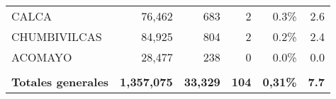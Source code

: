 \begin{tabular}{lrrrrr}
	\cellcolor[HTML]{9AFF99}CALCA         & 76,462                                                         & 683                                                                  & 2                                                              & 0.3\%                                                                  & 2.6                                                                                                                                \\
	\cellcolor[HTML]{9AFF99}CHUMBIVILCAS  & 84,925                                                         & 804                                                                  & 2                                                              & 0.2\%                                                                  & 2.4                                                                                                                                \\
	\cellcolor[HTML]{9AFF99}ACOMAYO       & 28,477                                                         & 238                                                                  & 0                                                              & 0.0\%                                                                  & 0.0                                                                                                                                \\
	&                                                                &                                                                      &                                                                &                                                                        &                                                                                                                                    \\
	\rowcolor[HTML]{ECF4FF} 
	\textbf{Totales generales}            & \textbf{1,357,075}                                             & \textbf{33,329}                                                      & \textbf{104}                                                   & \textbf{0,31\%}                                                        & \textbf{7.7}                                                                                                                      
\end{tabular}